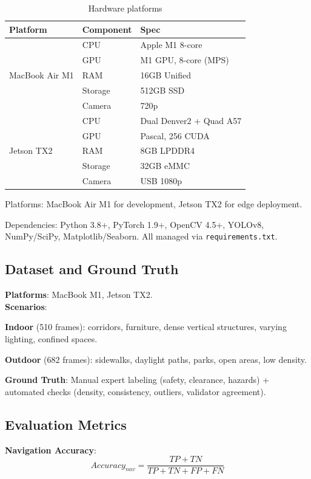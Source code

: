 \documentclass[12pt,oneside]{book}
\begin{document}
\begin{table}[ht]
\centering
\caption{Hardware platforms}
\label{tab:hardware_config}
\begin{tabular}{@{}lll@{}}
\toprule
\textbf{Platform} & \textbf{Component} & \textbf{Spec} \\
\midrule
\multirow{5}{*}{MacBook Air M1} & CPU & Apple M1 8-core \\
 & GPU & M1 GPU, 8-core (MPS) \\
 & RAM & 16GB Unified \\
 & Storage & 512GB SSD \\
 & Camera & 720p \\
\midrule
\multirow{5}{*}{Jetson TX2} & CPU & Dual Denver2 + Quad A57 \\
 & GPU & Pascal, 256 CUDA \\
 & RAM & 8GB LPDDR4 \\
 & Storage & 32GB eMMC \\
 & Camera & USB 1080p \\
\bottomrule
\end{tabular}
\end{table}

Platforms: MacBook Air M1 for development, Jetson TX2 for edge deployment.

Dependencies:
Python 3.8+, PyTorch 1.9+, OpenCV 4.5+, YOLOv8, NumPy/SciPy, Matplotlib/Seaborn.
All managed via \texttt{requirements.txt}.

\subsection{Dataset and Ground Truth}

\textbf{Platforms}: MacBook M1, Jetson TX2.
\textbf{\\Scenarios}:

\textbf{Indoor} (510 frames): corridors, furniture, dense vertical structures, varying lighting, confined spaces.

\textbf{Outdoor} (682 frames): sidewalks, daylight paths, parks, open areas, low density.

\textbf{Ground Truth}:
Manual expert labeling (safety, clearance, hazards) + automated checks (density, consistency, outliers, validator agreement).

\subsection{Evaluation Metrics}

\textbf{Navigation Accuracy}:
\begin{equation}
Accuracy_{nav} = \frac{TP+TN}{TP+TN+FP+FN}
\end{equation}
\end{document}
